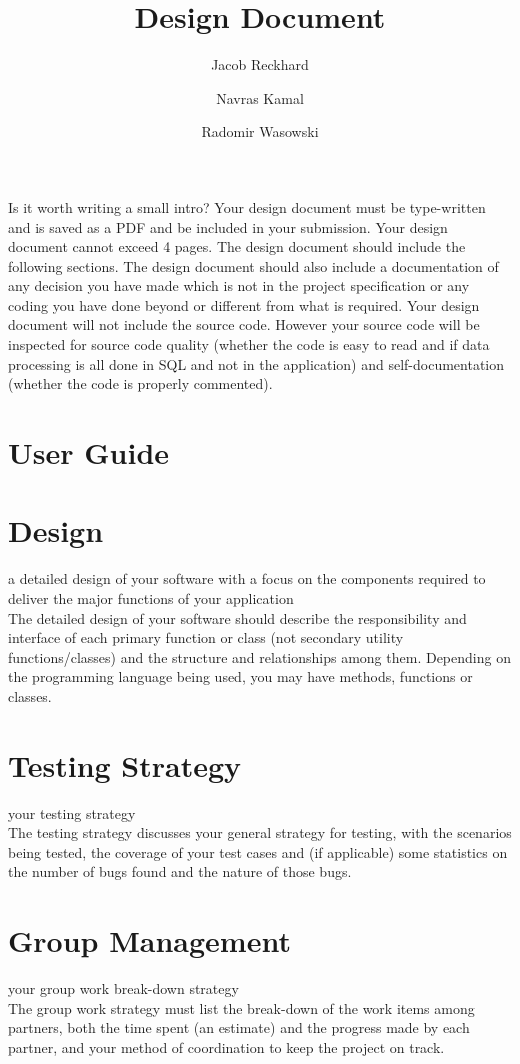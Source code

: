 \documentclass{article}
\title{Design Document}
\author{Jacob Reckhard \and Navras Kamal \and Radomir Wasowski}
\begin{document}
\maketitle

Is it worth writing a small intro? Your design document must be type-written and is saved as a PDF and be included in your submission. Your design document cannot exceed 4 pages. The design document should include the following sections. The design document should also include a documentation of any decision you have made which is not in the project specification or any coding you have done beyond or different from what is required. Your design document will not include the source code. However your source code will be inspected for source code quality (whether the code is easy to read and if data processing is all done in SQL and not in the application) and self-documentation (whether the code is properly commented).

\section{User Guide}


\section{Design}
a detailed design of your software with a focus on the components required to deliver the major functions of your application\\
The detailed design of your software should describe the responsibility and interface of each primary function or class (not secondary utility functions/classes) and the structure and relationships among them. Depending on the programming language being used, you may have methods, functions or classes.

\section{Testing Strategy}
your testing strategy\\
The testing strategy discusses your general strategy for testing, with the scenarios being tested, the coverage of your test cases and (if applicable) some statistics on the number of bugs found and the nature of those bugs.

\section{Group Management}
your group work break-down strategy\\
The group work strategy must list the break-down of the work items among partners, both the time spent (an estimate) and the progress made by each partner, and your method of coordination to keep the project on track.
\end{document}
